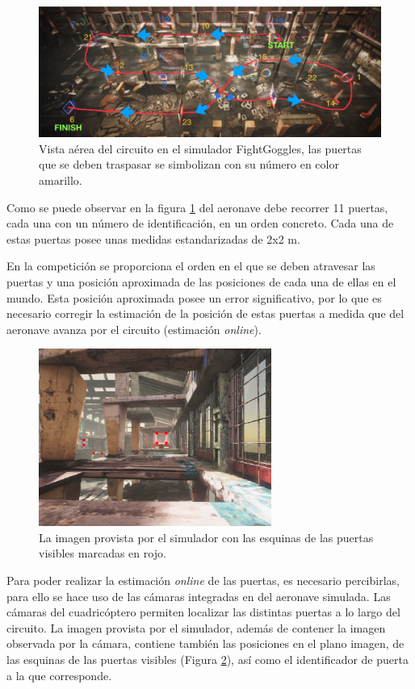 \begin{figure}[htb!]
	\centering
	\includegraphics[width=\textwidth]{imagenes/diagramacircuito}
	\caption{Vista aérea del circuito en el simulador FightGoggles, las puertas que se deben traspasar se simbolizan con su número en color amarillo.}
	\label{waypoints:circuito}
\end{figure}

Como se puede observar en la figura \ref{waypoints:circuito} del aeronave debe recorrer 11 puertas, cada una con un número de identificación, en un orden concreto. Cada una de estas puertas posee unas medidas estandarizadas de 2x2 m.

En la competición se proporciona el orden en el que se deben atravesar las puertas y una posición aproximada de las posiciones de cada una de ellas en el mundo. Esta posición aproximada posee un error significativo, por lo que es necesario corregir la estimación de la posición de estas puertas a medida que del aeronave avanza por el circuito (estimación \textit{online}).
\begin{figure}[htb!]
	\centering
	\includegraphics[width=0.68\textwidth]{imagenes/red_points}
	\caption{La imagen provista por el simulador con las esquinas de las puertas visibles marcadas en rojo.}
	\label{redpoints}
\end{figure}


Para poder realizar la estimación \textit{online} de las puertas, es necesario percibirlas, para ello se hace uso de las cámaras integradas en del aeronave simulada. Las cámaras del cuadricóptero permiten localizar las distintas puertas a lo largo del circuito. La imagen provista por el simulador, además de contener la imagen observada por la cámara, contiene también las posiciones en el plano imagen, de las esquinas de las puertas visibles (Figura \ref{redpoints}), así como el identificador de puerta a la que corresponde.



